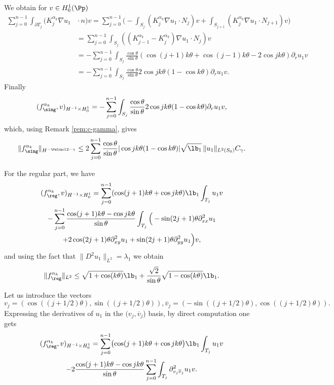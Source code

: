 We obtain for $v \in H_0^1(\Pp)$
\begin{align*}
\sum_{j=0}^{n-1} \int_{\partial T_j} (K_j^{\alpha_k}\nabla u_1 &{}\cdot n) v = \sum_{j=0}^{n-1}\biggl(- \int_{S_j} (K_j^{\alpha_k}\nabla u_1 \cdot N_j) v
+\int_{S_{j+1}} (K_j^{\alpha_k}\nabla u_1 \cdot N_{j+1})v
\biggr) \\
&= \sum_{j=0}^{n-1} \int_{S_j}((K_{j-1}^{\alpha_k}-K_j^{\alpha_k})\nabla u_1 \cdot N_j) v
\\
&= -\sum_{j=0}^{n-1}\int_{S_j} \frac{\cos \theta}{\sin \theta} (\cos (j+1)k\theta+\cos (j-1)k\theta - 2 \cos jk\theta) \partial_r u_1 v \\
&= -\sum_{j=0}^{n-1}\int_{S_j} \frac{\cos \theta}{\sin \theta} 2 \cos jk\theta(1-\cos k \theta) \partial_r u_1 v.
\end{align*}
Finally
\[
(f_{\sing}^{\alpha_k}, v)_{H^{-1}\times H^1_0} = -\sum_{j=0}^{n-1}\int_{S_j} \frac{\cos \theta}{\sin \theta} 2 \cos jk\theta(1-\cos k \theta) \partial_r u_1 v,
\]
which, using Remark \ref{rem:c-gamma}, gives
\[
\|f_{\sing}^{\alpha_k}\|_{H^{-\Psfrac 12-\gamma}}\le 2\sum_{j=0}^{n-1} \frac{\cos \theta}{\sin \theta} | \cos jk\theta(1-\cos k \theta)| \sqrt{\lb_1}\,\|u_1\|_{L^2(S_0)} C_\gamma.
\]

For the regular part, we have\vspace*{-5pt}
\begin{multline*}(f_{\reg}^{\alpha_k}, v)_{H^{-1}\times H^1_0}= \sum_{j=0}^{n-1} (\cos (j+1)k\theta+\cos jk\theta) \lb_1 \int_{T_j} u_1v\\
- \sum_{j=0}^{n-1} {\frac{\cos(j+1)k\theta-\cos jk\theta}{\sin \theta}} \int_{T_j} \Big (-\sin (2j+1)\theta \partial^2_{xx}u_1 \\
+ 2 \cos (2j+1)\theta \partial^2_{xy} u_1+ \sin(2j+1)\theta \partial^2_{yy} u_1\Big)v,
\end{multline*}
and using the fact that $\|D^2 u_1\|_{L^2} = \lambda_1$ we obtain
\[
\|f^{\alpha_k}_{\reg}\|_{L^2}\le \sqrt{1+\cos (k \theta)} \lb_1 +\frac{\sqrt{2}}{\sin \theta} \sqrt{1- \cos (k \theta)}\lb_1 .
\]

\begin{rem}
Let us introduce the vectors
\[
v_j=(\cos((j+1/2)\theta), \sin ((j+1/2)\theta)), \overline v_j= (-\sin((j+1/2)\theta), \cos ((j+1/2)\theta)).
\]
Expressing the derivatives of $u_1$ in the $(v_j, \overline v_j$) basis, by direct computation one gets\vspace*{-5pt}
\begin{multline*}
(f_{\reg}^{\alpha_k}, v)_{H^{-1}\times H^1_0}
=\sum_{j=0}^{n-1} \bigl(\cos (j+1)k\theta+\cos jk\theta\bigr) \lb_1 \int_{T_j} u_1v\\
-2 \frac{\cos(j+1)k\theta-\cos jk\theta}{\sin \theta} \sum_{j=0}^{n-1} \int_{T_j} \partial^2_{v_j\overline v_j}u_1 v.
\end{multline*}
\label{rem:reg-part-change-basis}
\end{rem}

